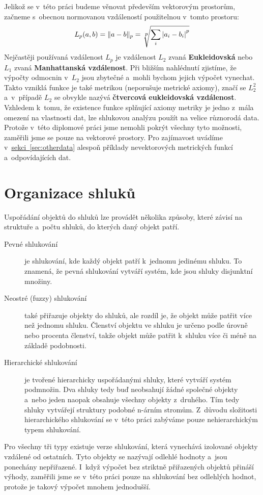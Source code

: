 Jelikož se v~této práci budeme věnovat především vektorovým prostorům, začneme s~obecnou normovanou vzdáleností použitelnou v~tomto prostoru:
$$L_p(a, b)=\|a-b\|_p=\sqrt[\leftroot{-1}\uproot{3}\scriptstyle p]{\sum_i |a_i - b_i|\strut^p} $$
Nejčastěji používaná vzdálenost $L_p$ je vzdálenost $L_2$ zvaná \textbf {Eukleidovská} nebo $L_1$ zvaná \textbf {Manhattanská vzdá\-le\-nost}.
Při bližším nahlédnutí zjistíme, že výpočty odmocnin v~$L_2$ jsou zbytečné a~mohli bychom jejich výpočet vynechat. Takto vzniklá funkce je také metrikou (neporušuje metrické axiomy), značí se $L_2^2$  a~v~případě $L_2$ se obvykle nazývá \textbf {čtvercová eukleidovská vzdálenost}.\\

Vzhledem k~tomu, že existence funkce splňující axiomy metriky je jedno z~mála omezení na vlastnosti dat, lze shlukovou analýzu použít na velice různorodá data. Protože v~této diplomové práci jsme nemohli pokrýt všechny tyto možnosti, zaměřili jsme se pouze na vektorové prostory. Pro zajímavost uvádíme v~\hyperref[sec:otherdata]{sekci~\ref*{sec:otherdata}} alespoň příklady nevektorových metrických funkcí a~odpovídajících dat.

\section{Organizace shluků} \label{sec:clusterorganization}
Uspořádání objektů do shluků lze provádět několika způsoby, které závisí na struktuře a~počtu shluků, do kterých daný objekt patří.
\begin{description}
\item[Pevné shlukování] je shlukování, kde každý objekt patří k~jednomu jedinému shluku. To znamená, že pevná shlukování vytváří systém, kde jsou shluky disjunktní množiny.
\item[Neostré (fuzzy) shlukování] také přiřazuje objekty do shluků, ale rozdíl je, že objekt může patřit více než jednomu shluku. Členství objektu ve shluku je určeno podle úrovně nebo procenta členství, takže objekt může patřit k~shluku více či méně na základě podobnosti.
\item[Hierarchické shlukování] je tvořené hierarchicky uspořádanými shluky, které vytváří systém podmnožin. Dva shluky tedy buď neobsahují žádné společné objekty a~nebo jeden naopak obsahuje všechny objekty z~druhého. Tím tedy shluky vytvářejí struktury podobné n-árním stromům. Z~důvodu složitosti hierarchického shlukování se v~této práci zabýváme pouze nehierarchickým typem shlukování.
\end{description}
Pro všechny tři typy existuje verze shlukování, která vynechává izolované objekty vzdálené od ostatních. Tyto objekty se nazývají odlehlé hodnoty a~jsou ponechány nepřiřazené. I~když výpočet bez striktně přiřazených objektů přináší výhody, zaměřili jsme se v~této práci pouze na shlukování bez odlehlých hodnot, protože je takový výpočet mnohem jednodušší.\\

